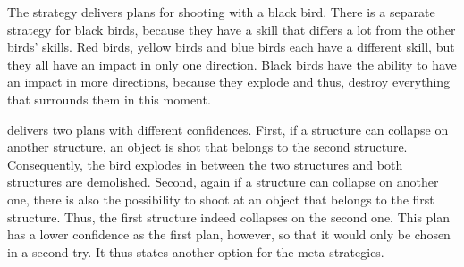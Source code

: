 The strategy  delivers plans for shooting with a black bird. There is a separate strategy for black birds, because they have a skill that differs a lot from the other birds' skills. Red birds, yellow birds and blue birds each have a different skill, but they all have an impact in only one direction. Black birds have the ability to have an impact in more directions, because they explode and thus, destroy everything that surrounds them in this moment.

 delivers two plans with different confidences. First, if a structure can collapse on another structure, an object is shot that belongs to the second structure. Consequently, the bird explodes in between the two structures and both structures are demolished. Second, again if a structure can collapse on another one, there is also the possibility to shoot at an object that belongs to the first structure. Thus, the first structure indeed collapses on the second one. This plan has a lower confidence as the first plan, however, so that it would only be chosen in a second try. It thus states another option for the meta strategies.